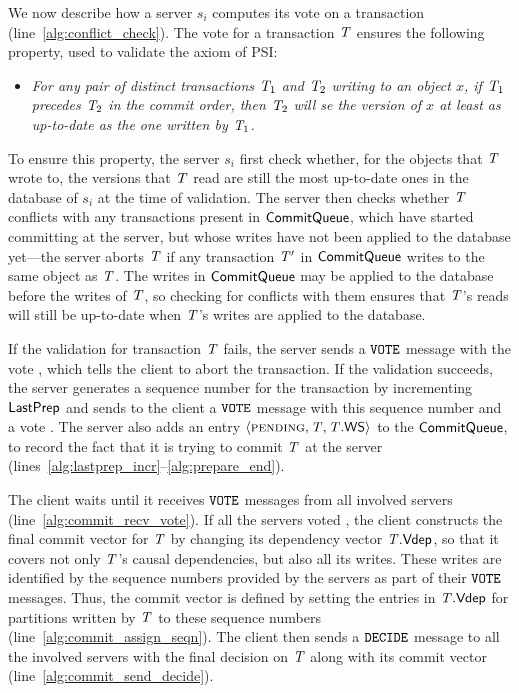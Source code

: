 We now describe how a server $s_i$ computes its vote on a transaction (line~\ref{alg:conflict_check}). The vote for a transaction $\mathit{T}$ ensures the following property, used to validate the \Wconflict axiom of PSI: 

\begin{itemize}
    \item \emph{For any pair of distinct transactions $\mathit{T}_1$ and $\mathit{T}_2$ writing to an object $x$, if $\mathit{T}_1$ precedes $\mathit{T}_2$ in the commit order, then $\mathit{T}_2$ will se the version of $x$ at least as up-to-date as the one written by $\mathit{T}_1$.}
\end{itemize}

To ensure this property, the server $s_i$ first check whether, for the objects that $\mathit{T}$ wrote to, the versions that $\mathit{T}$ read are still the most up-to-date ones in the database of $s_i$ at the time of validation. The server then checks whether $\mathit{T}$ conflicts with any transactions present in $\mathsf{CommitQueue}$, which have started committing at the server, but whose writes have not been applied to the database yet---the server aborts $\mathit{T}$ if any transaction $\mathit{T}'$ in $\mathsf{CommitQueue}$ writes to the same object as $\mathit{T}$. The writes in $\mathsf{CommitQueue}$ may be applied to the database before the writes of $\mathit{T}$, so checking for conflicts with them ensures that $\mathit{T}$'s reads will still be up-to-date when $\mathit{T}$'s writes are applied to the database.

If the validation for transaction $\mathit{T}$ fails, the server sends a ${\tt VOTE}$ message with the vote \abort, which tells the client to abort the transaction. If the validation succeeds, the server generates a sequence number for the transaction by incrementing $\mathsf{LastPrep}$ and sends to the client a ${\tt VOTE}$ message with this sequence number and a vote \commit. The server also adds an entry $\langle \text{\sc pending}, \mathit{T}, \mathit{T}.\mathsf{WS} \rangle$ to the $\mathsf{CommitQueue}$, to record the fact that it is trying to commit $\mathit{T}$ at the server (lines~\ref{alg:lastprep_incr}--\ref{alg:prepare_end}).

The client waits until it receives ${\tt VOTE}$ messages from all involved servers (line~\ref{alg:commit_recv_vote}). If all the servers voted \commit, the client constructs the final commit vector for $\mathit{T}$ by changing its dependency vector $\mathit{T}.\mathsf{Vdep}$, so that it covers not only $\mathit{T}$'s causal dependencies, but also all its writes. These writes are identified by the sequence numbers provided by the servers as part of their ${\tt VOTE}$ messages. Thus, the commit vector is defined by setting the entries in $\mathit{T}.\mathsf{Vdep}$ for partitions written by $\mathit{T}$ to these sequence numbers (line~\ref{alg:commit_assign_seqn}). The client then sends a ${\tt DECIDE}$ message to all the involved servers with the final decision on $\mathit{T}$ along with its commit vector (line~\ref{alg:commit_send_decide}).

